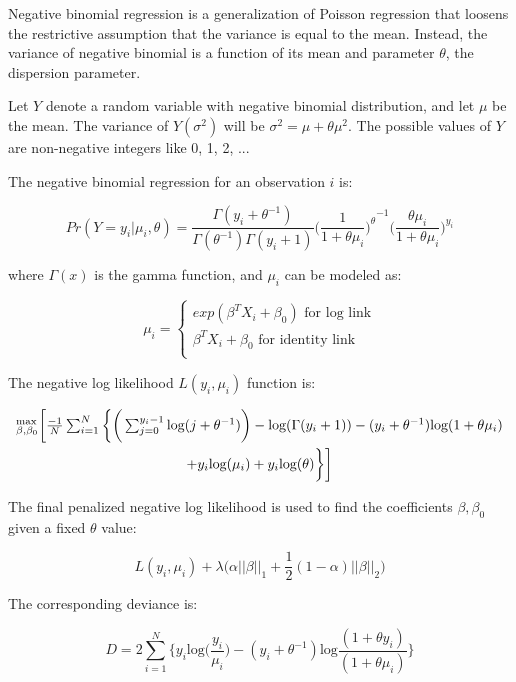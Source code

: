 Negative binomial regression is a generalization of Poisson regression that loosens the restrictive assumption that the variance is equal to the mean. Instead, the variance of negative binomial is a function of its mean and parameter $\theta$, the dispersion parameter. 

Let $Y$ denote a random variable with negative binomial distribution, and let $\mu$ be the mean. The variance of $Y (\sigma^2)$ will be $\sigma^2 = \mu + \theta\mu^2$. The possible values of $Y$ are non-negative integers like 0, 1, 2, ...

The negative binomial regression for an observation $i$ is:

$$Pr(Y = y_i|\mu_i, \theta) = \frac{\Gamma(y_i+\theta^{-1})}{\Gamma(\theta^{-1})\Gamma(y_i+1)} {\bigg(\frac {1} {1 + {\theta {\mu_i}}}\bigg) ^\theta}^{-1} { \bigg(\frac {{\theta {\mu_i}}} {1 + {\theta {\mu_i}}} \bigg) ^{y_i}}$$

where $\Gamma(x)$ is the gamma function, and $\mu_i$ can be modeled as:

$$ \mu_i=\left\{
                \begin{array}{ll}
                  exp (\beta^T X_i + \beta_0) \text{  for log link}\\
                  \beta^T X_i + \beta_0 \text{  for identity link}\\
                \end{array}
              \right. $$

The  negative log likelihood $L(y_i,\mu_i)$ function is:

\begin{multline*}
$$^\text{max}_{\beta,\beta_0} \bigg[ \frac{-1}{N} \sum_{i=1}^{N}  \bigg \{ \bigg( \sum_{j=0}^{y_i-1} \text{log}(j + \theta^{-1} ) \bigg) - \text{log} (\Gamma (y_i + 1)) - (y_i + \theta^{-1}) \text{log} (1 + \theta\mu_i) \\ + y_i \text{log}(\mu_i) + y_i \text{log} (\theta) \bigg \} \bigg]$$
\end{multline*}

The final penalized negative log likelihood is used to find the coefficients $\beta, \beta_0$ given a fixed $\theta$ value:

$$ L(y_i, \mu_i) + \lambda \big(\alpha || \beta || _1 + \frac{1}{2} (1 - \alpha) || \beta || _2 \big)$$

The corresponding deviance is:

$$D = 2 \sum_{i=1}^{N} \bigg \{ y_i \text{log} \big(\frac{y_i}{\mu_i} \big) - (y_i + \theta^{-1}) \text{log} \frac{(1+\theta y_i)}{(1+\theta \mu_i)} \bigg \}$$

